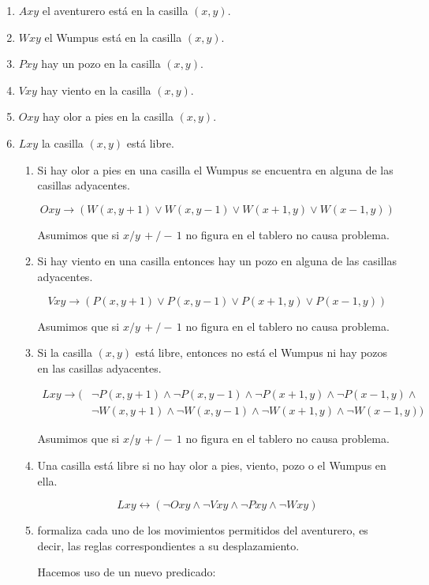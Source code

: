 \documentclass[11pt,letterpaper]{article}
\begin{document}
\begin{enumerate}
  \bi
\item $Axy$ el aventurero está en la casilla $(x,y)$.
\item $Wxy$ el Wumpus está en la casilla $(x,y)$.
\item $Pxy$ hay un pozo en la casilla $(x,y)$.
\item $Vxy$ hay viento en la casilla $(x,y)$.
\item $Oxy$ hay olor a pies en la casilla $(x,y)$.
\item $Lxy$ la casilla $(x,y)$ está libre.
  \ei
  \begin{enumerate}
  \item Si hay olor a pies en una casilla el Wumpus se encuentra en alguna de las casillas adyacentes.

    $$Oxy \rightarrow (W(x,y+1)\lor W(x,y-1)\lor W(x+1,y)\lor W(x-1,y))$$

    Asumimos que si $x/y\, +/-\, 1$ no figura en el tablero no causa
    problema.

  \item Si hay viento en una casilla entonces hay un pozo en alguna de las casillas adyacentes.

    $$ Vxy \rightarrow (P(x,y+1)\lor P(x,y-1)\lor P(x+1,y)\lor P(x-1,y))$$

    Asumimos que si $x/y\, +/-\, 1$ no figura en el tablero no causa
    problema.
  \item Si la casilla $(x,y)$ está libre, entonces no está el Wumpus ni hay pozos en las casillas adyacentes.

    \begin{align*}
      Lxy \rightarrow (&\neg P(x,y+1)\land\neg P(x,y-1)\land\neg P(x+1,y)
    \land\neg P(x-1,y)\land\\
    &\neg W(x,y+1)\land\neg W(x,y-1)\land\neg W(x+1,y)
    \land\neg W(x-1,y))
    \end{align*}

    Asumimos que si $x/y\, +/-\, 1$ no figura en el tablero no causa
    problema.

  \item Una casilla está libre si no hay olor a pies, viento, pozo o el Wumpus en ella.

    $$Lxy\leftrightarrow (\neg Oxy\land \neg Vxy\land \neg Pxy\land \neg Wxy)$$
  \item formaliza cada uno de los movimientos permitidos del aventurero, es decir, las reglas correspondientes a su desplazamiento.

    Hacemos uso de un nuevo predicado:


\end{enumerate}
\end{enumerate}
\end{document}

